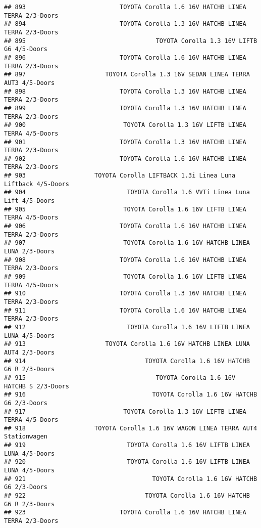\documentclass[]{article}
\begin{document}
\begin{verbatim}
## 893                          TOYOTA Corolla 1.6 16V HATCHB LINEA TERRA 2/3-Doors
## 894                          TOYOTA Corolla 1.3 16V HATCHB LINEA TERRA 2/3-Doors
## 895                                    TOYOTA Corolla 1.3 16V LIFTB G6 4/5-Doors
## 896                          TOYOTA Corolla 1.6 16V HATCHB LINEA TERRA 2/3-Doors
## 897                      TOYOTA Corolla 1.3 16V SEDAN LINEA TERRA AUT3 4/5-Doors
## 898                          TOYOTA Corolla 1.3 16V HATCHB LINEA TERRA 2/3-Doors
## 899                          TOYOTA Corolla 1.3 16V HATCHB LINEA TERRA 2/3-Doors
## 900                           TOYOTA Corolla 1.3 16V LIFTB LINEA TERRA 4/5-Doors
## 901                          TOYOTA Corolla 1.3 16V HATCHB LINEA TERRA 2/3-Doors
## 902                          TOYOTA Corolla 1.6 16V HATCHB LINEA TERRA 2/3-Doors
## 903                   TOYOTA Corolla LIFTBACK 1.3i Linea Luna Liftback 4/5-Doors
## 904                            TOYOTA Corolla 1.6 VVTi Linea Luna Lift 4/5-Doors
## 905                           TOYOTA Corolla 1.6 16V LIFTB LINEA TERRA 4/5-Doors
## 906                          TOYOTA Corolla 1.6 16V HATCHB LINEA TERRA 2/3-Doors
## 907                           TOYOTA Corolla 1.6 16V HATCHB LINEA LUNA 2/3-Doors
## 908                          TOYOTA Corolla 1.6 16V HATCHB LINEA TERRA 2/3-Doors
## 909                           TOYOTA Corolla 1.6 16V LIFTB LINEA TERRA 4/5-Doors
## 910                          TOYOTA Corolla 1.3 16V HATCHB LINEA TERRA 2/3-Doors
## 911                          TOYOTA Corolla 1.6 16V HATCHB LINEA TERRA 2/3-Doors
## 912                            TOYOTA Corolla 1.6 16V LIFTB LINEA LUNA 4/5-Doors
## 913                      TOYOTA Corolla 1.6 16V HATCHB LINEA LUNA AUT4 2/3-Doors
## 914                                 TOYOTA Corolla 1.6 16V HATCHB G6 R 2/3-Doors
## 915                                    TOYOTA Corolla 1.6 16V HATCHB S 2/3-Doors
## 916                                   TOYOTA Corolla 1.6 16V HATCHB G6 2/3-Doors
## 917                           TOYOTA Corolla 1.3 16V LIFTB LINEA TERRA 4/5-Doors
## 918                   TOYOTA Corolla 1.6 16V WAGON LINEA TERRA AUT4 Stationwagen
## 919                            TOYOTA Corolla 1.6 16V LIFTB LINEA LUNA 4/5-Doors
## 920                            TOYOTA Corolla 1.6 16V LIFTB LINEA LUNA 4/5-Doors
## 921                                   TOYOTA Corolla 1.6 16V HATCHB G6 2/3-Doors
## 922                                 TOYOTA Corolla 1.6 16V HATCHB G6 R 2/3-Doors
## 923                          TOYOTA Corolla 1.6 16V HATCHB LINEA TERRA 2/3-Doors

\end{verbatim}
\end{document}
